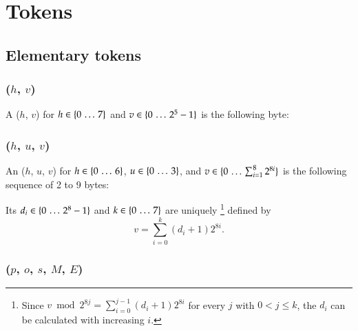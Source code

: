
\section{Tokens}
\label{sec:tokens}

\subsection{Elementary tokens}

\subsubsection{\DborMinimalToken(\texorpdfstring{$h$, $v$}{h, v})}
\hypertarget{sec:def:MinimalToken}{}

A \DborMinimalToken($h$, $v$)
for $h \in \{0 \,\ldots\, 7\}$
and $v \in \{0 \,\ldots\, 2^5 - 1\}$
is the following byte:



\subsubsection{\DborNaturalToken(\texorpdfstring{$h$, $u$, $v$}{h, u, v})}
\hypertarget{sec:def:NaturalToken}{}

An \DborNaturalToken($h$, $u$, $v$)
for $h \in \{0 \,\ldots\, 6\}$,
$u \in \{0 \,\ldots\, 3\}$,
and $v \in \{0 \,\ldots\, \sum_{i = 1}^8 2^{8i}\}$
is the following sequence of 2 to 9 bytes:


Its $d_i \in \{0 \,\ldots\, 2^8 - 1\}$ and $k \in \{0 \,\ldots\, 7\}$ are uniquely%
\footnote{%
    Since $v \bmod 2^{8 j} = \sum_{i = 0}^{j - 1} (d_i + 1) 2^{8 i}$ for every $j$ with $0 < j \le k$,
    the $d_i$ can be calculated with increasing $i$.
}
defined by
\begin{equation}
    v =\sum_{i = 0}^k (d_i + 1) 2^{8 i}.
\end{equation}


\subsubsection{\DborBinaryRationalToken(\texorpdfstring{$p$, $o$, $s$, $M$, $E$}{p, o, s, M, E})}
\hypertarget{sec:def:BinaryRationalToken}{}

